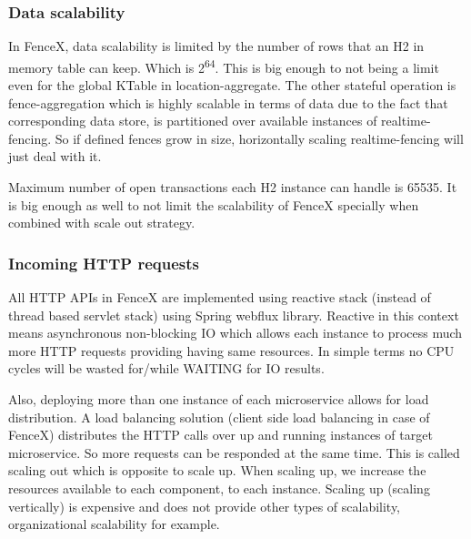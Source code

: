 \documentclass[a4]{report}
\begin{document}
    \subsubsection{Data scalability}
    In FenceX, data scalability is limited by the number of rows that an H2\cite{h2} in memory table can keep.
    Which is 2\textsuperscript{64}.
    This is big enough to not being a limit even for the global KTable in location-aggregate.
    The other stateful operation is fence-aggregation which is highly scalable in terms of data due to the
    fact that corresponding data store, is partitioned over available instances of realtime-fencing.
    So if defined fences grow in size, horizontally scaling realtime-fencing will just deal with it.

    Maximum number of open transactions each H2 instance can handle is 65535.
    It is big enough as well to not limit the scalability of FenceX specially when combined with scale out strategy.

    \subsubsection{Incoming HTTP requests}
    All HTTP APIs in FenceX are implemented using reactive stack (instead of thread based servlet stack) using Spring
    webflux library.
    Reactive in this context means asynchronous non-blocking IO which allows each instance to process much more HTTP
    requests providing having same resources.
    In simple terms no CPU cycles will be wasted for/while WAITING for IO results.

    Also, deploying more than one instance of each microservice allows for load distribution.
    A load balancing solution (client side load balancing in case of FenceX) distributes the HTTP calls over up and
    running instances of target microservice.
    So more requests can be responded at the same time.
    This is called scaling out which is opposite to scale up.
    When scaling up, we increase the resources available to each component, to each instance.
    Scaling up (scaling vertically) is expensive and does not provide other types of scalability, organizational
    scalability for example.
\end{document}
